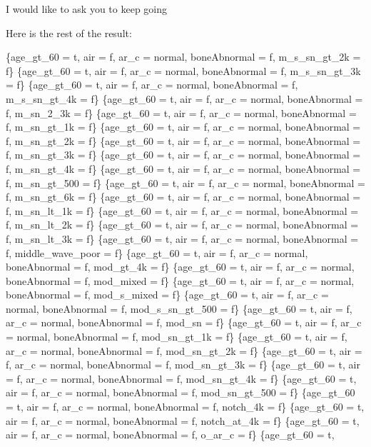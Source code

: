 \documentclass[12pt]{article}
\begin{document}
I would like to ask you to keep going
\begin{mdframed}

Here is the rest of the result:
\newline

    \{age\_gt\_60 = t, air = f, ar\_c = normal, boneAbnormal = f, m\_s\_sn\_gt\_2k = f\}
    \{age\_gt\_60 = t, air = f, ar\_c = normal, boneAbnormal = f, m\_s\_sn\_gt\_3k = f\}
    \{age\_gt\_60 = t, air = f, ar\_c = normal, boneAbnormal = f, m\_s\_sn\_gt\_4k = f\}
    \{age\_gt\_60 = t, air = f, ar\_c = normal, boneAbnormal = f, m\_sn\_2\_3k = f\}
    \{age\_gt\_60 = t, air = f, ar\_c = normal, boneAbnormal = f, m\_sn\_gt\_1k = f\}
    \{age\_gt\_60 = t, air = f, ar\_c = normal, boneAbnormal = f, m\_sn\_gt\_2k = f\}
    \{age\_gt\_60 = t, air = f, ar\_c = normal, boneAbnormal = f, m\_sn\_gt\_3k = f\}
    \{age\_gt\_60 = t, air = f, ar\_c = normal, boneAbnormal = f, m\_sn\_gt\_4k = f\}
    \{age\_gt\_60 = t, air = f, ar\_c = normal, boneAbnormal = f, m\_sn\_gt\_500 = f\}
    \{age\_gt\_60 = t, air = f, ar\_c = normal, boneAbnormal = f, m\_sn\_gt\_6k = f\}
    \{age\_gt\_60 = t, air = f, ar\_c = normal, boneAbnormal = f, m\_sn\_lt\_1k = f\}
    \{age\_gt\_60 = t, air = f, ar\_c = normal, boneAbnormal = f, m\_sn\_lt\_2k = f\}
    \{age\_gt\_60 = t, air = f, ar\_c = normal, boneAbnormal = f, m\_sn\_lt\_3k = f\}
    \{age\_gt\_60 = t, air = f, ar\_c = normal, boneAbnormal = f, middle\_wave\_poor = f\}
    \{age\_gt\_60 = t, air = f, ar\_c = normal, boneAbnormal = f, mod\_gt\_4k = f\}
    \{age\_gt\_60 = t, air = f, ar\_c = normal, boneAbnormal = f, mod\_mixed = f\}
    \{age\_gt\_60 = t, air = f, ar\_c = normal, boneAbnormal = f, mod\_s\_mixed = f\}
    \{age\_gt\_60 = t, air = f, ar\_c = normal, boneAbnormal = f, mod\_s\_sn\_gt\_500 = f\}
    \{age\_gt\_60 = t, air = f, ar\_c = normal, boneAbnormal = f, mod\_sn = f\}
    \{age\_gt\_60 = t, air = f, ar\_c = normal, boneAbnormal = f, mod\_sn\_gt\_1k = f\}
    \{age\_gt\_60 = t, air = f, ar\_c = normal, boneAbnormal = f, mod\_sn\_gt\_2k = f\}
    \{age\_gt\_60 = t, air = f, ar\_c = normal, boneAbnormal = f, mod\_sn\_gt\_3k = f\}
    \{age\_gt\_60 = t, air = f, ar\_c = normal, boneAbnormal = f, mod\_sn\_gt\_4k = f\}
    \{age\_gt\_60 = t, air = f, ar\_c = normal, boneAbnormal = f, mod\_sn\_gt\_500 = f\}
    \{age\_gt\_60 = t, air = f, ar\_c = normal, boneAbnormal = f, notch\_4k = f\}
    \{age\_gt\_60 = t, air = f, ar\_c = normal, boneAbnormal = f, notch\_at\_4k = f\}
    \{age\_gt\_60 = t, air = f, ar\_c = normal, boneAbnormal = f, o\_ar\_c = f\}
    \{age\_gt\_60 = t,
    
\end{mdframed}
\end{document}
